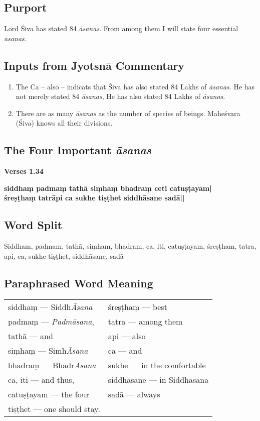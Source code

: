 \subsection*{Purport}

Lord Śiva has stated 84 \textit{āsanas}. From among them I will state four essential \textit{āsanas}.

\subsection*{Inputs from Jyotsnā Commentary}

\begin{enumerate}
\item The Ca – also – indicats that Śiva has also stated 84 Lakhs of \textit{āsanas}. He has not merely stated 84 \textit{āsanas}, He has also stated 84 Lakhs of \textit{āsanas}. 
\item There are as many \textit{āsanas} as the number of species of beings. Maheśvara (Śiva) knows all their divisions. 
\end{enumerate}

\subsection*{The Four Important \textit{āsanas}}

\noindent 
\textbf{Verses 1.34}

\begin{shloka}
\textbf{siddhaṃ padmaṃ tathā siṃhaṃ bhadraṃ ceti catuṣṭayam|}\\
\textbf{śreṣṭhaṃ tatrāpi ca sukhe tiṣṭhet siddhāsane sadā||}
\end{shloka}

\subsection*{Word Split}

Siddham, padmam, tathā, siṃham, bhadram, ca, iti, catuṣṭayam, śreṣṭham, tatra, api, ca, sukhe tiṣṭhet, siddhāsane, sadā

\subsection*{Paraphrased Word Meaning}

\begin{longtable}{>{\noindent\raggedright}p{5cm}>{\noindent\raggedright}p{5cm}}
siddhaṃ --- Siddh\textit{Āsana} & śreṣṭhaṃ --- best\tabularnewline
padmaṃ --- \textit{Padmāsana},  & tatra --- among them\tabularnewline
tathā --- and & api --- also\tabularnewline
siṃhaṃ --- Simh\textit{Āsana} & ca --- and\tabularnewline
bhadraṃ --- Bhadr\textit{Āsana} & sukhe --- in the comfortable\tabularnewline
ca, iti --- and thus,  & siddhāsane --- in Siddhāsana\tabularnewline
catuṣṭayam --- the four & sadā --- always\tabularnewline
tiṣṭhet --- one should stay. &
\end{longtable}

